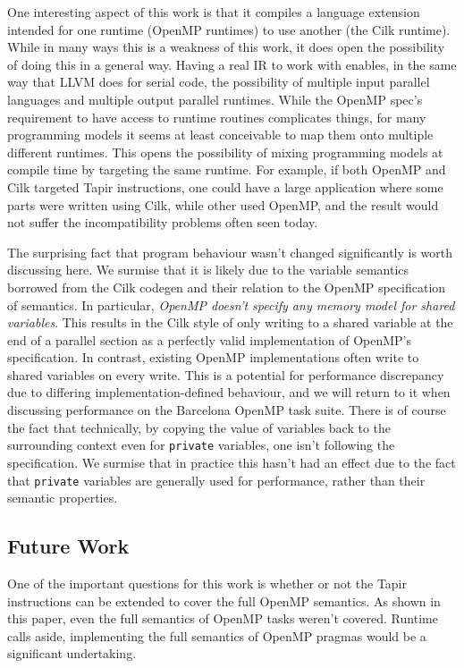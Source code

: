 \documentclass[sigconf]{acmart}
\begin{document}
One interesting aspect of this work is that it compiles a language extension intended
for one runtime (OpenMP runtimes) to use another (the Cilk runtime). While in many
ways this is a weakness of this work, it does open the possibility of doing this 
in a general way. Having a real IR to work with enables, in the same way that LLVM
does for serial code, the possibility of multiple input parallel languages and
multiple output parallel runtimes. While the OpenMP spec's requirement to
have access to runtime routines complicates things, for many programming models
it seems at least conceivable to map them onto multiple different runtimes. This
opens the possibility of mixing programming models at compile time by targeting
the same runtime. For example, if both OpenMP and Cilk targeted Tapir
instructions, one could have a large application where some parts were written
using Cilk, while other used OpenMP, and the result would not suffer the
incompatibility problems often seen today. 

The surprising fact that program behaviour wasn't changed significantly is
worth discussing here. We surmise that it is likely due to the variable
semantics borrowed from the Cilk codegen and their relation to the OpenMP
specification of semantics. In particular, \emph{OpenMP doesn't specify any
memory model for shared variables}. This results in the Cilk style of only
writing to a shared variable at the end of a parallel section as a perfectly
valid implementation of OpenMP's specification. In contrast, existing OpenMP
implementations often write to shared variables on every write. This is a
potential for performance discrepancy due to differing implementation-defined
behaviour, and we will return to it when discussing performance on the
Barcelona OpenMP task suite. There is of course the fact that technically, by
copying the value of variables back to the surrounding context even for
\texttt{private} variables, one isn't following the specification. We surmise
that in practice this hasn't had an effect due to the fact that
\texttt{private} variables are generally used for performance, rather than
their semantic properties. 

\subsection{Future Work} \label{Sec:Future}

One of the important questions for this work is whether or not the Tapir
instructions can be extended to cover the full OpenMP semantics. As shown
in this paper, even the full semantics of OpenMP tasks weren't covered. Runtime
calls aside, implementing the full semantics of OpenMP pragmas would be a
significant undertaking. 
\end{document}

